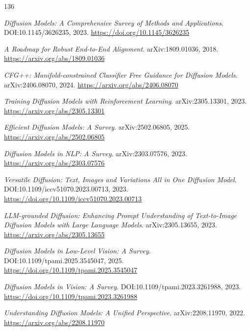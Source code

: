\documentclass[11pt,a4paper]{article}
\begin{document}
\begin{thebibliography}{136}
\setlength{\itemsep}{2pt}

\newblock \emph{Diffusion Models: A Comprehensive Survey of Methods and Applications}.
\newblock DOI:10.1145/3626235, 2023.
\newblock \url{https://doi.org/10.1145/3626235}

\newblock \emph{A Roadmap for Robust End-to-End Alignment}.
\newblock arXiv:1809.01036, 2018.
\newblock \url{https://arxiv.org/abs/1809.01036}

\newblock \emph{CFG++: Manifold-constrained Classifier Free Guidance for Diffusion Models}.
\newblock arXiv:2406.08070, 2024.
\newblock \url{https://arxiv.org/abs/2406.08070}

\newblock \emph{Training Diffusion Models with Reinforcement Learning}.
\newblock arXiv:2305.13301, 2023.
\newblock \url{https://arxiv.org/abs/2305.13301}

\newblock \emph{Efficient Diffusion Models: A Survey}.
\newblock arXiv:2502.06805, 2025.
\newblock \url{https://arxiv.org/abs/2502.06805}

\newblock \emph{Diffusion Models in NLP: A Survey}.
\newblock arXiv:2303.07576, 2023.
\newblock \url{https://arxiv.org/abs/2303.07576}

\newblock \emph{Versatile Diffusion: Text, Images and Variations All in One Diffusion Model}.
\newblock DOI:10.1109/iccv51070.2023.00713, 2023.
\newblock \url{https://doi.org/10.1109/iccv51070.2023.00713}

\newblock \emph{LLM-grounded Diffusion: Enhancing Prompt Understanding of Text-to-Image Diffusion Models with Large Language Models}.
\newblock arXiv:2305.13655, 2023.
\newblock \url{https://arxiv.org/abs/2305.13655}

\newblock \emph{Diffusion Models in Low-Level Vision: A Survey}.
\newblock DOI:10.1109/tpami.2025.3545047, 2025.
\newblock \url{https://doi.org/10.1109/tpami.2025.3545047}

\newblock \emph{Diffusion Models in Vision: A Survey}.
\newblock DOI:10.1109/tpami.2023.3261988, 2023.
\newblock \url{https://doi.org/10.1109/tpami.2023.3261988}

\newblock \emph{Understanding Diffusion Models: A Unified Perspective}.
\newblock arXiv:2208.11970, 2022.
\newblock \url{https://arxiv.org/abs/2208.11970}


\end{thebibliography}
\end{document}

